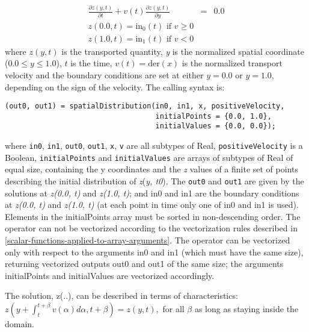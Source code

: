 \begin{eqnarray*}
\frac{\partial z(y,t)}{\partial t}+v(t)\frac{\partial z(y,t)}{\partial y}&=&0.0\\
z(0.0, t)=\mathrm{in}_0(t) \text{ if $v\ge 0$}\\
z(1.0, t)=\mathrm{in}_1(t) \text{ if $v<0$}
\end{eqnarray*}
where $z(y, t)$ is the transported quantity, \emph{y} is the
normalized spatial coordinate ($0.0 \le y \le 1.0$), $t$ is the
time, $v(t)=\mathrm{der}(x)$ is the normalized
transport velocity and the boundary conditions are set at either
$y=0.0$ or $y=1.0$, depending on the sign of the velocity.
The calling syntax is:
\begin{lstlisting}[language=modelica]
(out0, out1) = spatialDistribution(in0, in1, x, positiveVelocity,
                                   initialPoints = {0.0, 1.0},
                                   initialValues = {0.0, 0.0});
\end{lstlisting}
where \lstinline[basicstyle=\ttfamily]!in0!, \lstinline[basicstyle=\ttfamily]!in1!, \lstinline[basicstyle=\ttfamily]!out0!, \lstinline[basicstyle=\ttfamily]!out1!, \lstinline[basicstyle=\ttfamily]!x!, \lstinline[basicstyle=\ttfamily]!v! are all subtypes of Real,
\lstinline[basicstyle=\ttfamily]!positiveVelocity! is a Boolean, \lstinline[basicstyle=\ttfamily]!initialPoints! and \lstinline[basicstyle=\ttfamily]!initialValues! are
arrays of subtypes of Real of equal size, containing the y coordinates
and the \emph{z} values of a finite set of points describing the initial
distribution of \emph{z}(\emph{y, t0}). The \lstinline[basicstyle=\ttfamily]!out0! and \lstinline[basicstyle=\ttfamily]!out1! are given by
the solutions at \emph{z(0.0, t)} and \emph{z(1.0, t)}; and in0 and in1
are the boundary conditions at \emph{z(0.0, t)} and \emph{z(1.0, t)} (at
each point in time only one of in0 and in1 is used). Elements in the
initialPoints array must be sorted in non-descending order. The operator
can not be vectorized according to the vectorization rules described in
\autoref{scalar-functions-applied-to-array-arguments}. The operator can be vectorized only with respect to the
arguments in0 and in1 (which must have the same size), returning
vectorized outputs out0 and out1 of the same size; the arguments
initialPoints and initialValues are vectorized accordingly.

The solution, z(..), can be described in terms of characteristics:\\
$z(y+\int_t^{t+\beta}v(\alpha)d\alpha,t+\beta)=z(y,t),$ for all $\beta$ as long as staying inside the domain.

